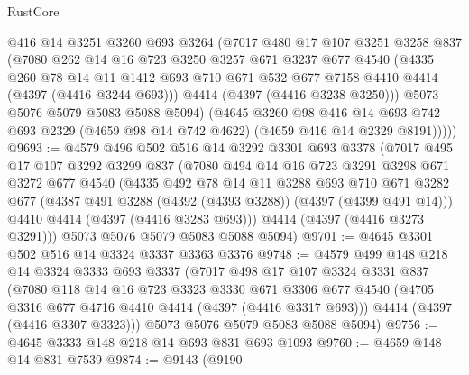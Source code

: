 \begin{lexlean}{RustCore}
\begin{coremodule}
          @416
          @14
          @3251
          @3260
          @693
          @3264
          (@7017
            @480
            @17
            @107
            @3251
            @3258
            @837
            (@7080
              @262
              @14
              @16
              @723
              @3250
              @3257
              @671
              @3237
              @677
              @4540
              (@4335
                @260
                @78
                @14
                @11
                @1412
                @693
                @710
                @671
                @532
                @677
                @7158
                @4410
                @4414
                (@4397 (@4416 @3244 @693)))
              @4414
              (@4397 (@4416 @3238 @3250)))
            @5073
            @5076
            @5079
            @5083
            @5088
            @5094)
          (@4645
            @3260
            @98
            @416
            @14
            @693
            @742
            @693
            @2329
            (@4659 @98 @14 @742 @4622)
            (@4659 @416 @14 @2329 @8191)))))
@9693 := @4579
    @496
    @502
    @516
    @14
    @3292
    @3301
    @693
    @3378
    (@7017
      @495
      @17
      @107
      @3292
      @3299
      @837
      (@7080
        @494
        @14
        @16
        @723
        @3291
        @3298
        @671
        @3272
        @677
        @4540
        (@4335
          @492
          @78
          @14
          @11
          @3288
          @693
          @710
          @671
          @3282
          @677
          (@4387 @491 @3288 (@4392 (@4393 @3288)) (@4397 (@4399 @491 @14)))
          @4410
          @4414
          (@4397 (@4416 @3283 @693)))
        @4414
        (@4397 (@4416 @3273 @3291)))
      @5073
      @5076
      @5079
      @5083
      @5088
      @5094)
@9701 := @4645 @3301 @502 @516 @14 @3324 @3337 @3363 @3376
@9748 := @4579
    @499
    @148
    @218
    @14
    @3324
    @3333
    @693
    @3337
    (@7017
      @498
      @17
      @107
      @3324
      @3331
      @837
      (@7080
        @118
        @14
        @16
        @723
        @3323
        @3330
        @671
        @3306
        @677
        @4540
        (@4705 @3316 @677 @4716 @4410 @4414 (@4397 (@4416 @3317 @693)))
        @4414
        (@4397 (@4416 @3307 @3323)))
      @5073
      @5076
      @5079
      @5083
      @5088
      @5094)
@9756 := @4645 @3333 @148 @218 @14 @693 @831 @693 @1093
@9760 := @4659 @148 @14 @831 @7539
@9874 := @9143
    (@9190

\end{coremodule}
\end{lexlean}

